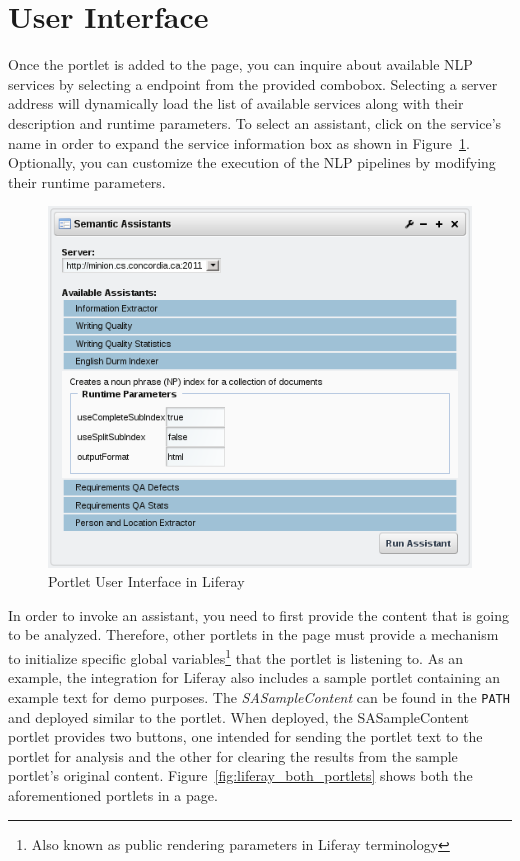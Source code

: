 \section{User Interface}
Once the portlet is added to the page, you can inquire about available NLP services by selecting a \sa endpoint from the provided combobox. Selecting a server address will dynamically load the list of available services along with their description and runtime parameters. To select an assistant, click on the service's name in order to expand the service information box as shown in Figure~\ref{fig:liferay_sa_portlet}. Optionally, you can customize the execution of the NLP pipelines by modifying their runtime parameters.

\begin{figure}
\centering
\includegraphics[scale=0.6]{pictures/liferay_sa_portlet.png}
\caption{\sa Portlet User Interface in Liferay}
\label{fig:liferay_sa_portlet}
\end{figure}

\blankline

In order to invoke an assistant, you need to first provide the content that is going to be analyzed. Therefore, other portlets in the page must provide a mechanism to initialize specific global variables\footnote{Also known as public rendering parameters in Liferay terminology} that the \sa portlet is listening to. As an example, the \sa integration for Liferay also includes a sample portlet containing an example text for demo purposes. The \emph{SASampleContent} can be found in the \texttt{PATH} and deployed similar to the \sa portlet. When deployed, the SASampleContent portlet provides two buttons, one intended for sending the portlet text to the \sa portlet for analysis and the other for clearing the results from the sample portlet's original content. Figure~\ref{fig:liferay_both_portlets} shows both the aforementioned portlets in a page.

